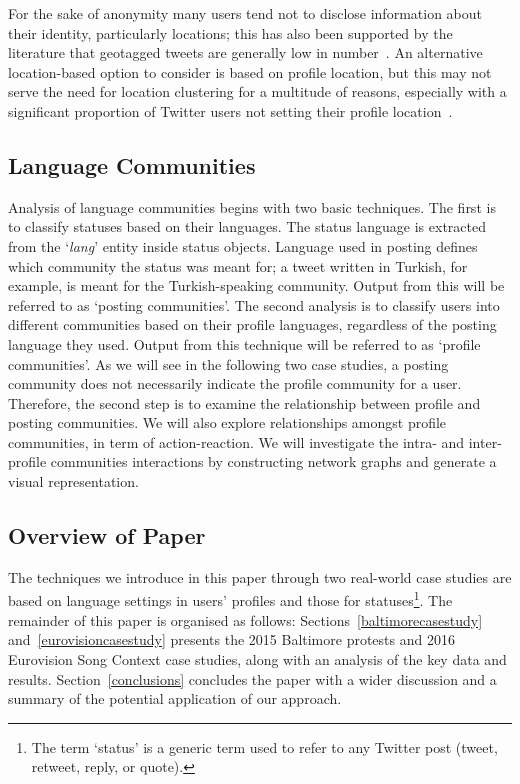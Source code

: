 For the sake of anonymity many users tend not to disclose information
about their identity, particularly locations; this has also been
supported by the literature that geotagged tweets are generally low in
number~\cite{kang-et-al:2013}. An alternative location-based option to
consider is based on profile location, but this may not serve the need
for location clustering for a multitude of reasons, especially with a
significant proportion of Twitter users not setting their profile
location~\cite{graham-et-al:2014}.

\subsection{Language Communities}\label{langcomm}

Analysis of language communities begins with two basic techniques. The
first is to classify statuses based on their languages. The status
language is extracted from the `{\emph{lang}}' entity inside status
objects. Language used in posting defines which community the status
was meant for; a tweet written in Turkish, for example, is meant for
the Turkish-speaking community. Output from this will be referred to
as `posting communities'. The second analysis is to classify users
into different communities based on their profile languages,
regardless of the posting language they used. Output from this
technique will be referred to as `profile communities'. As we will see
in the following two case studies, a posting community does not
necessarily indicate the profile community for a user. Therefore, the
second step is to examine the relationship between profile and posting
communities. We will also explore relationships amongst profile
communities, in term of action-reaction. We will investigate the
intra- and inter-profile communities interactions by constructing
network graphs and generate a visual representation.

\subsection{Overview of Paper}

The techniques we introduce in this paper through two real-world case
studies are based on language settings in users' profiles and those
for statuses\footnote{The term `status' is a generic term used to
refer to any Twitter post (tweet, retweet, reply, or quote).}. The
remainder of this paper is organised as follows:
Sections~\ref{baltimorecasestudy} and~\ref{eurovisioncasestudy}
presents the 2015 Baltimore protests and 2016 Eurovision Song Context
case studies, along with an analysis of the key data and
results. Section~\ref{conclusions} concludes the paper with a wider
discussion and a summary of the potential application of our approach.


